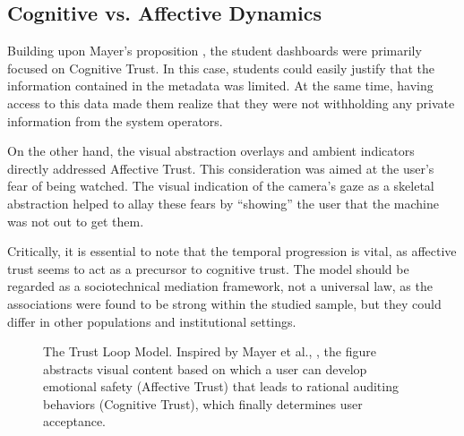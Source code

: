 \documentclass[conference]{IEEEtran}
\begin{document}
\subsection{Cognitive vs. Affective Dynamics}

Building upon Mayer’s proposition \cite{b6}, the student dashboards were primarily focused on Cognitive Trust. In this case, students could easily justify that the information contained in the metadata was limited. At the same time, having access to this data made them realize that they were not withholding any private information from the system operators.

On the other hand, the visual abstraction overlays and ambient indicators directly addressed Affective Trust. This consideration was aimed at the user’s fear of being watched. The visual indication of the camera’s gaze as a skeletal abstraction helped to allay these fears by “showing” the user that the machine was not out to get them.

Critically, it is essential to note that the temporal progression is vital, as affective trust seems to act as a precursor to cognitive trust. The model should be regarded as a sociotechnical mediation framework, not a universal law, as the associations were found to be strong within the studied sample, but they could differ in other populations and institutional settings.

\begin{figure}[htbp]
\centering
{}
\caption{The Trust Loop Model. Inspired by Mayer et al., \cite{b6}, the figure abstracts visual content based on which a user can develop emotional safety (Affective Trust) that leads to rational auditing behaviors (Cognitive Trust), which finally determines user acceptance.}
\label{fig:trust_loop}
\end{figure}
\end{document}
